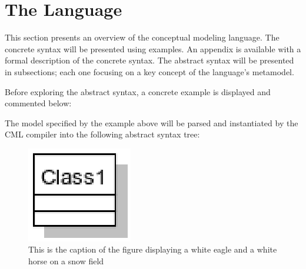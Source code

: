 \section{The Language}\label{sec:lang}
%
This section presents an overview of the conceptual modeling language.
The concrete syntax will be presented using examples.
An appendix is available with a formal description of the concrete syntax.
The abstract syntax will be presented in subsections; each one focusing on a key concept of the language's metamodel.

Before exploring the abstract syntax, a concrete example is displayed and commented below:



The model specified by the example above will be parsed and instantiated by the CML compiler into the following abstract syntax tree:

\begin{figure}
\centering
\includegraphics{language/main}
\caption{This is the caption of the figure displaying a white eagle and
a white horse on a snow field}
\end{figure}
